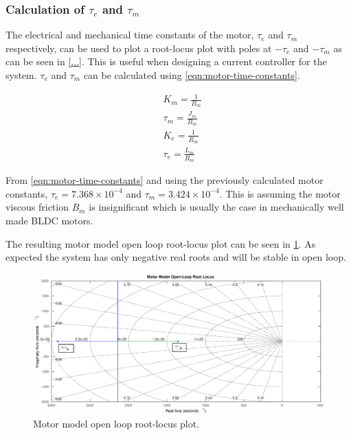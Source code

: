 \subsubsection{Calculation of $\tau_e$ and $\tau_m$}
The electrical and mechanical time constants of the motor, $\tau_e$ and $\tau_m$ respectively, can be used to plot a root-locus plot with poles at $-\tau_e$ and $-\tau_m$ as can be seen in \cref{...}. This is useful when designing a current controller for the system. $\tau_e$ and $\tau_m$ can be calculated using \cref{eqn:motor-time-constants}.

\begin{equation} \label{eqn:motor-time-constants}
\begin{aligned}
&K_m = \frac{1}{B_m} \\
&\tau_m = \frac{J_m}{B_m} \\
&K_e = \frac{1}{R_m} \\
&\tau_e = \frac{L_m}{R_m} 
\end{aligned}
\end{equation}

From \cref{eqn:motor-time-constants} and using the previously calculated motor constants, $\tau_e = 7.368 \times 10^{-4}$ and $\tau_m = 3.424 \times 10^{-4}$. This is assuming the motor viscous friction $B_m$ is insignificant which is usually the case in mechanically well made BLDC motors.

The resulting motor model open loop root-locus plot can be seen in \cref{fig:ol-motor-rlocus}. As expected the system has only negative real roots and will be stable in open loop.

\begin{figure}
\centering
\includegraphics[width=1\textwidth]{images/motor/ol-motor-rlocus} 
\caption{Motor model open loop root-locus plot.}
\label{fig:ol-motor-rlocus}
\end{figure}


